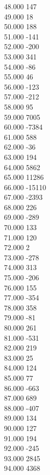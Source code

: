 { 48.000	147 \\
 49.000	18 \\
 50.000	188 \\
 51.000	-141 \\
 52.000	-200 \\
 53.000	341 \\
 54.000	-86 \\
 55.000	46 \\
 56.000	-123 \\
 57.000	-212 \\
 58.000	95 \\
 59.000	7005 \\
 60.000	-7384 \\
 61.000	588 \\
 62.000	-36 \\
 63.000	194 \\
 64.000	5862 \\
 65.000	11286 \\
 66.000	-15110 \\
 67.000	-2393 \\
 68.000	226 \\
 69.000	-289 \\
 70.000	133 \\
 71.000	120 \\
 72.000	2 \\
 73.000	-278 \\
 74.000	313 \\
 75.000	-206 \\
 76.000	155 \\
 77.000	-354 \\
 78.000	358 \\
 79.000	-81 \\
 80.000	261 \\
 81.000	-531 \\
 82.000	219 \\
 83.000	25 \\
 84.000	124 \\
 85.000	77 \\
 86.000	-663 \\
 87.000	689 \\
 88.000	-407 \\
 89.000	134 \\
 90.000	127 \\
 91.000	194 \\
 92.000	-245 \\
 93.000	2845 \\
 94.000	4368 \\
}
